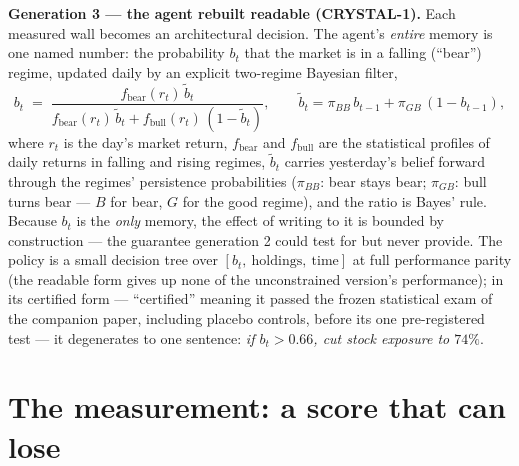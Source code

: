\documentclass[11pt]{article}
\begin{document}
\textbf{Generation 3 --- the agent rebuilt readable (CRYSTAL-1).} Each measured wall becomes
an architectural decision. The agent's \emph{entire} memory is one named number: the
probability $b_t$ that the market is in a falling (``bear'') regime, updated daily by an
explicit two-regime Bayesian filter,
\begin{equation}
b_t \;=\; \frac{f_{\text{bear}}(r_t)\,\tilde b_t}
{f_{\text{bear}}(r_t)\,\tilde b_t + f_{\text{bull}}(r_t)\,(1-\tilde b_t)},
\qquad
\tilde b_t = \pi_{BB}\, b_{t-1} + \pi_{GB}\,(1-b_{t-1}),
\label{eq:belief}
\end{equation}
where $r_t$ is the day's market return, $f_{\text{bear}}$ and $f_{\text{bull}}$ are the
statistical profiles of daily returns in falling and rising regimes, $\tilde b_t$ carries
yesterday's belief forward through the regimes' persistence probabilities
($\pi_{BB}$: bear stays bear; $\pi_{GB}$: bull turns bear --- $B$ for bear, $G$ for the
good regime), and the ratio is Bayes' rule.
Because $b_t$ is the \emph{only} memory, the effect of writing to it is bounded by
construction --- the guarantee generation 2 could test for but never provide. The policy is a
small decision tree over $[b_t,\ \text{holdings},\ \text{time}]$ at full performance parity
(the readable form gives up none of the unconstrained version's performance); in its
certified form --- ``certified'' meaning it passed the frozen statistical exam of the
companion paper, including placebo controls, before its one pre-registered test --- it
degenerates to one sentence: \emph{if $b_t > 0.66$, cut stock exposure to $74\%$}.

\section{The measurement: a score that can lose}
\label{sec:metrics}
\end{document}
